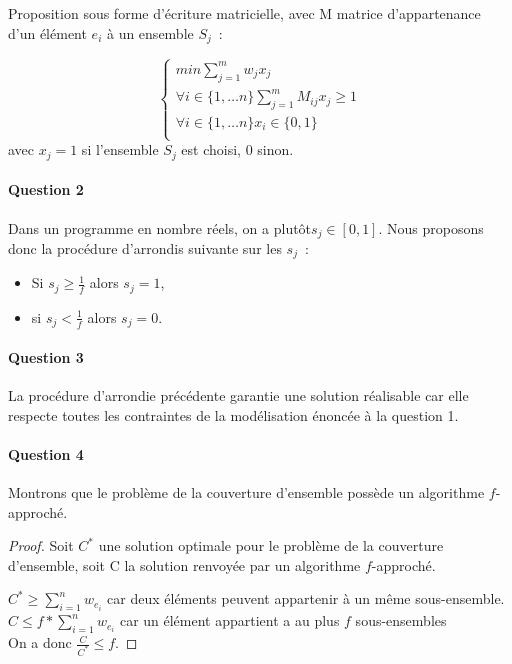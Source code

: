 \documentclass[a4paper, 12pt]{article}
\begin{document}
Proposition sous forme  d'écriture matricielle, avec M matrice
d'appartenance d'un élément $e_i$ à un ensemble $S_j$~:

\begin{equation}
\begin{cases}
min \sum_{j=1}^m w_j x_j\\
\forall i \in \{1, \dots n \} \sum_{j=1}^{m} M_{ij}x_{j} \geq 1 \\
\forall i \in \{1, \dots n\} x_i \in \{0,1\} \\
\end{cases}
\end{equation}
avec $x_j = 1$ si l'ensemble $S_j$ est choisi, 0 sinon.

\paragraph{Question 2}
 Dans un programme en nombre réels, on a plutôt$ s_j \in [0,1]$. Nous
 proposons donc la procédure d'arrondis suivante sur les $s_j$~:
\begin{itemize}
\item Si $s_j \geq \frac{1}{f}$ alors $s_j = 1$,
\item si $s_j < \frac{1}{f}$ alors $s_j = 0$.
\end{itemize}

\paragraph{Question 3}

La procédure d'arrondie précédente garantie une solution réalisable
car elle respecte toutes les contraintes de la modélisation énoncée à
la question 1.

\paragraph{Question 4}

Montrons que le problème de la couverture d'ensemble possède un
algorithme $f$-approché.

\begin{proof}
Soit $C^*$ une solution optimale pour le problème de la couverture
d'ensemble, soit C la solution renvoyée par un algorithme
$f$-approché.

$C^* \geq  \sum_{i=1}^n w_{e_i}$ car deux éléments peuvent appartenir à un même sous-ensemble.
$C \leq f * \sum_{i=1}^n w_{e_i}$ car un élément appartient a au plus $f$ sous-ensembles \\

On a donc $\frac{C}{C^*} \leq f$.
\end{proof}
\end{document}
